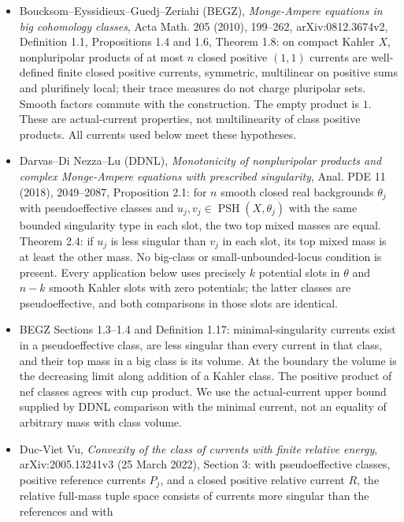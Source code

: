 \documentclass[
  11pt,
]{article}
\providecommand{\tightlist}{%
  \setlength{\itemsep}{0pt}\setlength{\parskip}{0pt}}
\begin{document}
\begin{itemize}
\tightlist
\item
  Boucksom--Eyssidieux--Guedj--Zeriahi (BEGZ), \emph{Monge-Ampere
  equations in big cohomology classes}, Acta Math. 205 (2010), 199--262,
  arXiv:0812.3674v2, Definition 1.1, Propositions 1.4 and 1.6, Theorem
  1.8: on compact Kahler \(X\), nonpluripolar products of at most \(n\)
  closed positive \((1,1)\) currents are well-defined finite closed
  positive currents, symmetric, multilinear on positive sums and
  plurifinely local; their trace measures do not charge pluripolar sets.
  Smooth factors commute with the construction. The empty product is
  \(1\). These are actual-current properties, not multilinearity of
  class positive products. All currents used below meet these
  hypotheses.
\item
  Darvas--Di Nezza--Lu (DDNL), \emph{Monotonicity of nonpluripolar
  products and complex Monge-Ampere equations with prescribed
  singularity}, Anal. PDE 11 (2018), 2049--2087, Proposition 2.1: for
  \(n\) smooth closed real backgrounds \(\theta_j\) with pseudoeffective
  classes and \(u_j,v_j\in\operatorname{PSH}(X,\theta_j)\) with the same
  bounded singularity type in each slot, the two top mixed masses are
  equal. Theorem 2.4: if \(u_j\) is less singular than \(v_j\) in each
  slot, its top mixed mass is at least the other mass. No big-class or
  small-unbounded-locus condition is present. Every application below
  uses precisely \(k\) potential slots in \(\theta\) and \(n-k\) smooth
  Kahler slots with zero potentials; the latter classes are
  pseudoeffective, and both comparisons in those slots are identical.
\item
  BEGZ Sections 1.3--1.4 and Definition 1.17: minimal-singularity
  currents exist in a pseudoeffective class, are less singular than
  every current in that class, and their top mass in a big class is its
  volume. At the boundary the volume is the decreasing limit along
  addition of a Kahler class. The positive product of nef classes agrees
  with cup product. We use the actual-current upper bound supplied by
  DDNL comparison with the minimal current, not an equality of arbitrary
  mass with class volume.
\item
  Duc-Viet Vu, \emph{Convexity of the class of currents with finite
  relative energy}, arXiv:2005.13241v3 (25 March 2022), Section 3: with
  pseudoeffective classes, positive reference currents \(P_j\), and a
  closed positive relative current \(R\), the relative full-mass tuple
  space consists of currents more singular than the references and with

\end{itemize}
\end{document}
